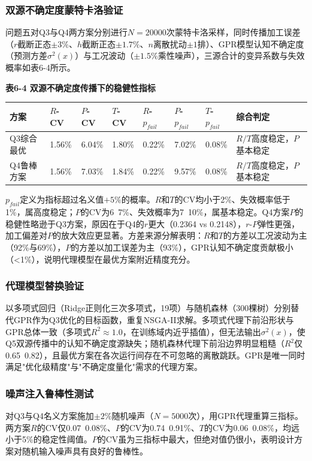 \documentclass[withoutpreface]{cumcmthesis}
\begin{document}
\subsubsection{双源不确定度蒙特卡洛验证}
问题五对Q3与Q4两方案分别进行$N=20000$次蒙特卡洛采样，同时传播加工误差（$r$截断正态$\pm3\%$、$h$截断正态$\pm1.7\%$、$n$离散扰动$\pm1$排）、GPR模型认知不确定度（预测方差$\sigma^2(x)$）与工况波动（$\pm1.5\%$乘性噪声），三源合计的变异系数与失效概率如表6-4所示。

\textbf{表6-4 双源不确定度传播下的稳健性指标}

\begin{table}[htbp]
\centering
\small
\begin{tabularx}{\textwidth}{XXXXXXXX}
\toprule
方案 & $R$-CV & $P$-CV & $T$-CV & $R$-$p_{fail}$ & $P$-$p_{fail}$ & $T$-$p_{fail}$ & 综合判定 \\
\midrule
Q3综合最优 & 1.56\% & 6.04\% & 1.80\% & 0.22\% & 7.02\% & 0.08\% & $R/T$高度稳定，$P$基本稳定 \\
Q4鲁棒方案 & 1.56\% & 7.03\% & 1.84\% & 0.22\% & 9.57\% & 0.08\% & $R/T$高度稳定，$P$基本稳定 \\
\bottomrule
\end{tabularx}
\end{table}
$p_{fail}$定义为指标超过名义值$+5\%$的概率。$R$和$T$的CV均小于2\%、失效概率低于1\%，属高度稳定；$P$的CV为6~7\%、失效概率为7~10\%，属基本稳定。Q4方案$P$的稳健性略逊于Q3方案，原因在于Q4的$r$更大（0.2364 vs 0.2148），$r$-$P$弹性更强，加工偏差对$P$的放大效应更显著。方差来源分解表明：$R$和$T$的方差以工况波动为主（92\%与69\%），$P$的方差以加工误差为主（93\%），GPR认知不确定度贡献极小（<1\%），说明代理模型在最优方案附近精度充分。

\subsubsection{代理模型替换验证}
以多项式回归（Ridge正则化三次多项式，19项）与随机森林（300棵树）分别替代GPR作为Q3优化的目标函数，重复NSGA-II求解。多项式代理下前沿形状与GPR总体一致（多项式$R^2\approx1.0$，在训练域内近乎插值），但无法输出$\sigma^2(x)$，使Q5双源传播中的认知不确定度源缺失；随机森林代理下前沿边界明显粗糙（$R^2$仅0.65~0.82），且最优方案在各次运行间存在不可忽略的离散跳跃。GPR是唯一同时满足"优化级精度"与"不确定度量化"需求的代理方案。

\subsubsection{噪声注入鲁棒性测试}
对Q3与Q4名义方案施加$\pm2\%$随机噪声（$N=5000$次），用GPR代理重算三指标。两方案$R$的CV仅0.07~0.08\%、$P$的CV为0.74~0.91\%、$T$的CV为0.06~0.08\%，均远小于5\%的稳定性阈值。$P$的CV虽为三指标中最大，但绝对值仍很小，表明设计方案对随机输入噪声具有良好的鲁棒性。
\end{document}
